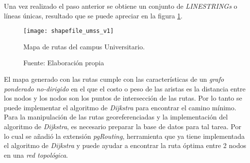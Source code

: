 
Una vez realizado el paso anterior se obtiene un conjunto de \emph{LINESTRINGs} o líneas únicas, resultado que se puede apreciar en la figura \ref{fig:shapefile_umss_v1}. \\






\begin{figure}[H]
  \begin{center}
    \texttt{[image: shapefile\_umss\_v1]}
    \caption{Mapa de rutas del campus Universitario.}
    \label{fig:shapefile_umss_v1}
    \caption*{Fuente: Elaboración propia}
  \end{center}
\end{figure}


El mapa generado con las rutas cumple con las características de un \emph{grafo ponderado no-dirigido} en el que el costo o peso de las aristas es la distancia entre los nodos y los nodos son los puntos de intersección de las rutas. Por lo tanto se puede implementar el algoritmo de \emph{Dijkstra} para encontrar el camino mínimo. \\

Para la manipulación de las rutas georeferenciadas y la implementación del algoritmo de \emph{Dijkstra}, es necesario preparar la base de datos para tal tarea. Por lo cual se añadió la extensión \emph{pgRouting}, herramienta que ya tiene implementada el algoritmo de \emph{Dijkstra} y puede ayudar a encontrar la ruta óptima entre 2 nodos en una \emph{red topológica}.\\

